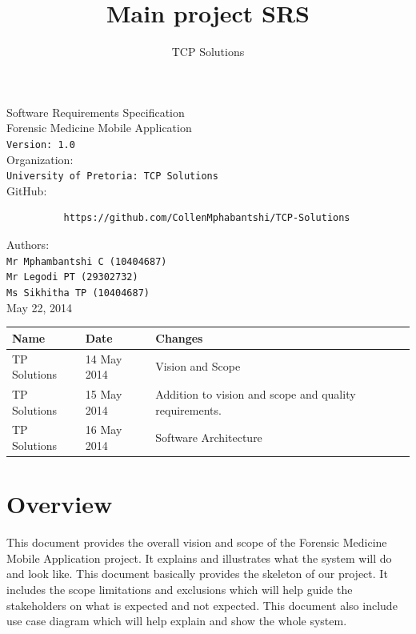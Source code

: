 \documentclass[10pt,a4paper]{article}
\author{TCP Solutions}
\title{Main project SRS}
\begin{document}
\begin{titlepage}
\begin{center}

\huge Software Requirements Specification\\[0.15cm]
\huge Forensic Medicine Mobile Application\\[0.15cm]
\large \texttt{Version: 1.0}\\[1cm]

Organization:\\
\texttt{University of Pretoria: TCP Solutions}\\[0.5cm]
GitHub:\\[0.01cm]

\begin{verbatim}
          https://github.com/CollenMphabantshi/TCP-Solutions
\end{verbatim}

Authors:\\
\texttt{Mr Mphambantshi C (10404687)\\
        Mr Legodi PT (29302732)\\
        Ms Sikhitha TP  (10404687)}\\[1cm]
        
May 22, 2014

\begin{tabular}{|l|l|l|}\hline
Name   & Date	& Changes	\\\hline
TP Solutions	& 14 May 2014	& Vision and Scope\\\hline
TP Solutions	& 15 May 2014	& Addition to vision and scope and quality requirements.\\\hline
TP Solutions	& 16 May 2014	& Software Architecture\\\hline
\end{tabular}

\end{center}
\end{titlepage}


\tableofcontents
\pagebreak
\section{Overview}
This document provides the overall vision and scope of the Forensic Medicine Mobile Application project. It explains and illustrates what the system will do and look like. This document basically provides the skeleton of our project. It includes the scope limitations and exclusions which will help guide the stakeholders on what is expected and not expected. This document also include use case diagram which will help explain and show the whole system.
\end{document}
